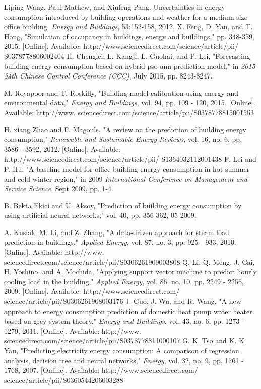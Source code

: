 \documentclass[conference]{IEEEtran}
\begin{document}
\begin{thebibliography}{00}
	
 Liping Wang, Paul Mathew, and Xiufeng Pang. Uncertainties
in energy consumption introduced by building operations and
weather for a medium-size office building. \textit{Energy and Buildings},
53:152-158, 2012.
 X. Feng, D. Yan, and T. Hong, "Simulation of occupancy in
buildings, energy and buildings," pp. 348-359, 2015. [Online].
	Available: http://www.sciencedirect.com/science/article/pii/
	S0378778806002404
 H. Chenglei, L. Kangji, L. Guohai, and P. Lei, "Forecasting
building energy consumption based on hybrid pso-ann prediction model," in \textit{2015 34th Chinese Control Conference (CCC)},
July 2015, pp. 8243-8247.

 M. Royapoor and T. Roskilly, "Building model calibration
using energy and environmental data," \textit{Energy and Buildings},
vol. 94, pp. 109 - 120, 2015. [Online]. Available: http://www.
	sciencedirect.com/science/article/pii/S0378778815001553
	
H. xiang Zhao and F. Magouls, "A review on the prediction
of building energy consumption," \textit{Renewable and Sustainable
Energy Reviews}, vol. 16, no. 6, pp. 3586 - 3592, 2012. [Online].
	Available: http://www.sciencedirect.com/science/article/pii/
	S1364032112001438
F. Lei and P. Hu, "A baseline model for office building energy
consumption in hot summer and cold winter region," in 2009
\textit{International Conference on Management and Service Science},
Sept 2009, pp. 1-4.

B. Bekta Ekici and U. Aksoy, "Prediction of building energy
consumption by using artificial neural networks," vol. 40, pp.
356-362, 05 2009.

A. Kusiak, M. Li, and Z. Zhang, "A data-driven approach for
steam load prediction in buildings," \textit{Applied Energy}, vol. 87,
no. 3, pp. 925 - 933, 2010. [Online]. Available: http://www.
	sciencedirect.com/science/article/pii/S0306261909003808
Q. Li, Q. Meng, J. Cai, H. Yoshino, and A. Mochida, "Applying
support vector machine to predict hourly cooling load in
the building," \textit{Applied Energy}, vol. 86, no. 10, pp. 2249 -
	2256, 2009. [Online]. Available: http://www.sciencedirect.com/
	science/article/pii/S0306261908003176
J. Guo, J. Wu, and R. Wang, "A new approach to energy
consumption prediction of domestic heat pump water heater
based on grey system theory," \textit{Energy and Buildings}, vol. 43,
no. 6, pp. 1273 - 1279, 2011. [Online]. Available: http://www.
	sciencedirect.com/science/article/pii/S0378778811000107
G. K. Tso and K. K. Yau, "Predicting electricity energy
consumption: A comparison of regression analysis, decision tree and neural networks," \textit{Energy}, vol. 32, no. 9, pp. 1761 -
	1768, 2007. [Online]. Available: http://www.sciencedirect.com/
	science/article/pii/S0360544206003288
	

\end{thebibliography}
\end{document}
